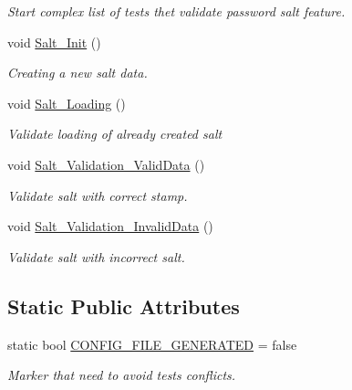 \begin{DoxyCompactItemize}
\begin{DoxyCompactList}\small\item\em Start complex list of tests thet validate password salt feature. \end{DoxyCompactList}\item 
void \mbox{\hyperlink{class_a_c_tests_1_1_tests_1_1_data_ab9053b60d639cfe8e427d157cdac706a}{Salt\+\_\+\+Init}} ()
\begin{DoxyCompactList}\small\item\em Creating a new salt data. \end{DoxyCompactList}\item 
void \mbox{\hyperlink{class_a_c_tests_1_1_tests_1_1_data_ade31d14086ddb2ebaaf87dfa38811c39}{Salt\+\_\+\+Loading}} ()
\begin{DoxyCompactList}\small\item\em Validate loading of already created salt \end{DoxyCompactList}\item 
void \mbox{\hyperlink{class_a_c_tests_1_1_tests_1_1_data_ab24c6c95a34b4749527df5ee38aa9853}{Salt\+\_\+\+Validation\+\_\+\+Valid\+Data}} ()
\begin{DoxyCompactList}\small\item\em Validate salt with correct stamp. \end{DoxyCompactList}\item 
void \mbox{\hyperlink{class_a_c_tests_1_1_tests_1_1_data_a9f6040bf528c877d8b063acafb3e92e5}{Salt\+\_\+\+Validation\+\_\+\+Invalid\+Data}} ()
\begin{DoxyCompactList}\small\item\em Validate salt with incorrect salt. \end{DoxyCompactList}\end{DoxyCompactItemize}
\subsection*{Static Public Attributes}
\begin{DoxyCompactItemize}
\item 
static bool \mbox{\hyperlink{class_a_c_tests_1_1_tests_1_1_data_afa7e60107f280684a34e4222ad48efda}{C\+O\+N\+F\+I\+G\+\_\+\+F\+I\+L\+E\+\_\+\+G\+E\+N\+E\+R\+A\+T\+ED}} = false
\begin{DoxyCompactList}\small\item\em Marker that need to avoid tests conflicts. \end{DoxyCompactList}\end{DoxyCompactItemize}


